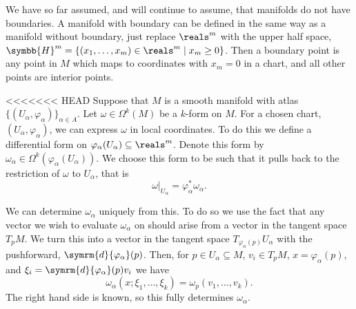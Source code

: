 \documentclass[fleqn]{NotesClass}
\renewcommand{\dl}{\symrm{d}}
\newcommand{\upperHalfSpace}{\symbb{H}}
\begin{document}
    \begin{remark}{}{}
        We have so far assumed, and will continue to assume, that manifolds do not have boundaries.
        A manifold with boundary can be defined in the same way as a manifold without boundary, just replace \(\reals^m\) with the upper half space, \(\upperHalfSpace^m = \{(x_1, \dotsc, x_m) \in \reals^m \mid x_m \ge 0\}\).
        Then a boundary point is any point in \(M\) which maps to coordinates with \(x_m = 0\) in a chart, and all other points are interior points.
    \end{remark}
    
<<<<<<< HEAD
    Suppose that \(M\) is a smooth manifold with atlas \(\{(U_\alpha, \varphi_\alpha)\}_{\alpha \in A}\).
    Let \(\omega \in \Omega^k(M)\) be a \(k\)-form on \(M\).
    For a chosen chart, \((U_\alpha, \varphi_\alpha)\), we can express \(\omega\) in local coordinates.
    To do this we define a differential form on \(\varphi_\alpha(U_\alpha) \subseteq \reals^m\).
    Denote this form by \(\omega_\alpha \in \Omega^k(\varphi_\alpha(U_\alpha))\).
    We choose this form to be such that it pulls back to the restriction of \(\omega\) to \(U_\alpha\), that is
    \begin{equation}
        \omega|_{U_\alpha} = \varphi_\alpha^*\omega_\alpha.
    \end{equation}
    
    We can determine \(\omega_\alpha\) uniquely from this.
    To do so we use the fact that any vector we wish to evaluate \(\omega_\alpha\) on should arise from a vector in the tangent space \(T_pM\).
    We turn this into a vector in the tangent space \(T_{\varphi_\alpha(p)}U_\alpha\) with the pushforward, \(\dl{\varphi_\alpha}(p)\).
    Then, for \(p \in U_\alpha \subseteq M\), \(v_i \in T_pM\), \(x = \varphi_\alpha(p)\), and \(\xi_i = \dl{\varphi_\alpha}(p)v_i\) we have
    \begin{equation}
        \omega_\alpha(x; \xi_1, \dotsc, \xi_k) = \omega_p(v_1, \dotsc, v_k).
    \end{equation}
    The right hand side is known, so this fully determines \(\omega_\alpha\).
    
\end{document}

